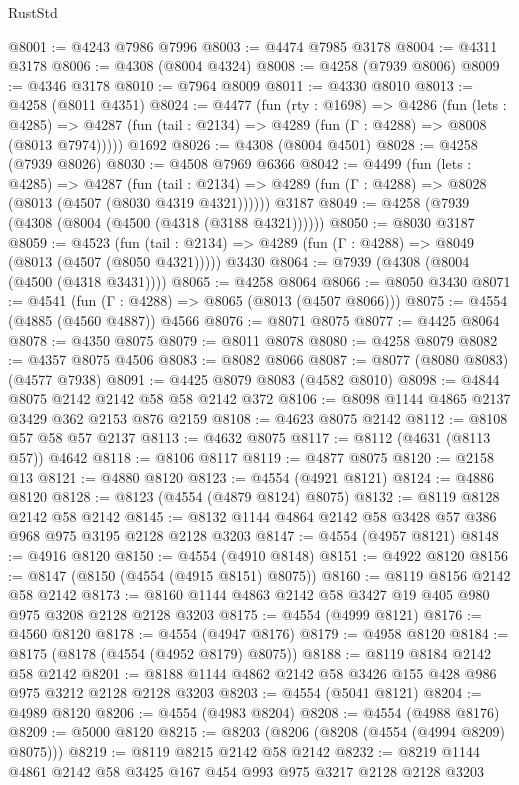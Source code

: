 \begin{lexlean}{RustStd}
\begin{coremodule}
@8001 := @4243 @7986 @7996
@8003 := @4474 @7985 @3178
@8004 := @4311 @3178
@8006 := @4308 (@8004 @4324)
@8008 := @4258 (@7939 @8006)
@8009 := @4346 @3178
@8010 := @7964 @8009
@8011 := @4330 @8010
@8013 := @4258 (@8011 @4351)
@8024 := @4477
    (fun (rty : @1698) =>
    @4286
      (fun (lets : @4285) =>
      @4287 (fun (tail : @2134) => @4289 (fun (Γ : @4288) => @8008 (@8013 @7974)))))
    @1692
@8026 := @4308 (@8004 @4501)
@8028 := @4258 (@7939 @8026)
@8030 := @4508 @7969 @6366
@8042 := @4499
    (fun (lets : @4285) =>
    @4287
      (fun (tail : @2134) => @4289 (fun (Γ : @4288) => @8028 (@8013 (@4507 (@8030 @4319 @4321))))))
    @3187
@8049 := @4258 (@7939 (@4308 (@8004 (@4500 (@4318 (@3188 @4321))))))
@8050 := @8030 @3187
@8059 := @4523
    (fun (tail : @2134) => @4289 (fun (Γ : @4288) => @8049 (@8013 (@4507 (@8050 @4321)))))
    @3430
@8064 := @7939 (@4308 (@8004 (@4500 (@4318 @3431))))
@8065 := @4258 @8064
@8066 := @8050 @3430
@8071 := @4541 (fun (Γ : @4288) => @8065 (@8013 (@4507 @8066)))
@8075 := @4554 (@4885 (@4560 @4887)) @4566
@8076 := @8071 @8075
@8077 := @4425 @8064
@8078 := @4350 @8075
@8079 := @8011 @8078
@8080 := @4258 @8079
@8082 := @4357 @8075 @4506
@8083 := @8082 @8066
@8087 := @8077 (@8080 @8083) (@4577 @7938)
@8091 := @4425 @8079 @8083 (@4582 @8010)
@8098 := @4844 @8075 @2142 @2142 @58 @58 @2142 @372
@8106 := @8098 @1144 @4865 @2137 @3429 @362 @2153 @876 @2159
@8108 := @4623 @8075 @2142
@8112 := @8108 @57 @58 @57 @2137
@8113 := @4632 @8075
@8117 := @8112 (@4631 (@8113 @57)) @4642
@8118 := @8106 @8117
@8119 := @4877 @8075
@8120 := @2158 @13
@8121 := @4880 @8120
@8123 := @4554 (@4921 @8121)
@8124 := @4886 @8120
@8128 := @8123 (@4554 (@4879 @8124) @8075)
@8132 := @8119 @8128 @2142 @58 @2142
@8145 := @8132 @1144 @4864 @2142 @58 @3428 @57 @386 @968 @975 @3195 @2128 @2128 @3203
@8147 := @4554 (@4957 @8121)
@8148 := @4916 @8120
@8150 := @4554 (@4910 @8148)
@8151 := @4922 @8120
@8156 := @8147 (@8150 (@4554 (@4915 @8151) @8075))
@8160 := @8119 @8156 @2142 @58 @2142
@8173 := @8160 @1144 @4863 @2142 @58 @3427 @19 @405 @980 @975 @3208 @2128 @2128 @3203
@8175 := @4554 (@4999 @8121)
@8176 := @4560 @8120
@8178 := @4554 (@4947 @8176)
@8179 := @4958 @8120
@8184 := @8175 (@8178 (@4554 (@4952 @8179) @8075))
@8188 := @8119 @8184 @2142 @58 @2142
@8201 := @8188 @1144 @4862 @2142 @58 @3426 @155 @428 @986 @975 @3212 @2128 @2128 @3203
@8203 := @4554 (@5041 @8121)
@8204 := @4989 @8120
@8206 := @4554 (@4983 @8204)
@8208 := @4554 (@4988 @8176)
@8209 := @5000 @8120
@8215 := @8203 (@8206 (@8208 (@4554 (@4994 @8209) @8075)))
@8219 := @8119 @8215 @2142 @58 @2142
@8232 := @8219 @1144 @4861 @2142 @58 @3425 @167 @454 @993 @975 @3217 @2128 @2128 @3203

\end{coremodule}
\end{lexlean}
